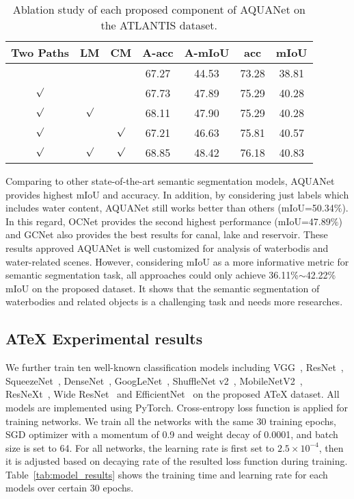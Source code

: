 \documentclass{article}
\begin{document}
\begin{table}[h]
	\centering
	\caption{Ablation study of each proposed component of AQUANet on the ATLANTIS dataset.}
\renewcommand\arraystretch{1.0}
{\begin{tabular}{ccc|cccc}
			\toprule
			Two Paths & LM & CM &A-acc &A-mIoU & acc & mIoU  \\
			\midrule
			 & & & 67.27 & 44.53 &73.28 &38.81 \\
			$\surd$ & & & 67.73 & 47.89 & 75.29 &40.28\\
			$\surd$ &$\surd$ & & 68.11 & 47.90 &75.29 &40.28\\
			$\surd$ & &$\surd$ & 67.21 &46.63 &75.81 &40.57  \\
			$\surd$ &$\surd$ &$\surd$ & 68.85 & 48.42 & 76.18 &40.83 \\
			\bottomrule

	\end{tabular}}
	\label{tab:ablation}
\end{table}

Comparing to other state-of-the-art semantic segmentation models, AQUANet provides highest mIoU and accuracy. In addition, by considering just labels which includes water content, AQUANet still works better than others (mIoU=50.34$\%$). In this regard, OCNet provides the second highest performance (mIoU=47.89$\%$) and GCNet also provides the best results for canal, lake and reservoir. These results approved AQUANet is well customized for analysis of waterbodis and water-related scenes. However, considering mIoU as a more informative metric for semantic segmentation task, all approaches could only achieve 36.11\%$\sim$42.22\% mIoU on the proposed dataset. It shows that the semantic segmentation of waterbodies and related objects is a challenging task and needs more researches.

\subsection{ATeX Experimental results}
We further train ten well-known classification models including VGG~\cite{simonyan2014very}, ResNet~\cite{he2016deep}, SqueezeNet~\cite{iandola2016squeezenet}, DenseNet~\cite{huang2017densely}, GoogLeNet~\cite{szegedy2015going}, ShuffleNet v2~\cite{ma2018shufflenet}, MobileNetV2~\cite{sandler2018mobilenetv2}, ResNeXt~\cite{xie2017aggregated}, Wide ResNet~\cite{zagoruyko2016wide} and EfficientNet~\cite{tan2019efficientnet} on the proposed ATeX dataset. All models are implemented using PyTorch. Cross-entropy loss function is applied for training networks. We train all the networks with the same 30 training epochs, SGD optimizer with a momentum of 0.9 and weight decay of 0.0001, and batch size is set to 64. For all networks, the learning rate is first set to $2.5 \times 10^{-4}$, then it is adjusted based on decaying rate of the resulted loss function during training. Table~\ref{tab:model_results} shows the training time and learning rate for each models over certain 30 epochs.
\end{document}
